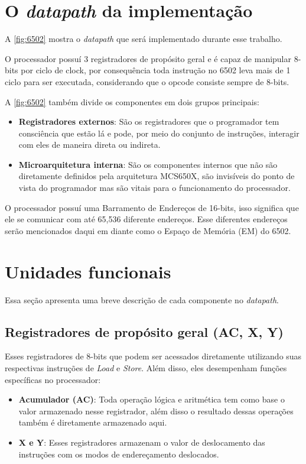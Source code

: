 \documentclass[
	12pt,				  %
	openright,		%
	a4paper,			%
	english,			%
	french,				%
	spanish,			%
	brazil,				%
]{abntex2}
\begin{document}
\section{O \emph{datapath} da implementação}
A \autoref{fig:6502} mostra o \emph{datapath} que será implementado durante esse
trabalho.

O processador possuí 3 registradores de propósito geral e é capaz de manipular
8-bits por ciclo de clock, por consequência toda instrução no 6502 leva mais de
1 ciclo para ser executada, considerando que o opcode consiste sempre de 8-bits.

A \autoref{fig:6502} também divide os componentes em dois grupos principais:
\begin{itemize}
	\item \textbf{Registradores externos}: São os registradores que o programador
	      tem consciência que estão lá e pode, por meio do conjunto de instruções,
	      interagir com eles de maneira direta ou indireta.
	\item \textbf{Microarquitetura interna}: São os componentes internos que não
	      são diretamente definidos pela arquitetura MCS650X, são invisíveis do
	      ponto de vista do programador mas são vitais para o funcionamento do
	      processador.
\end{itemize}

O processador possuí uma Barramento de Endereços de 16-bits, isso significa que
ele se comunicar com até 65,536 diferente endereços. Esse diferentes endereços
serão mencionados daqui em diante como o Espaço de Memória (EM) do 6502.

\section{Unidades funcionais}
Essa seção apresenta uma breve descrição de cada componente no \emph{datapath}.

\subsection{Registradores de propósito geral (AC, X, Y)}
Esses registradores de 8-bits que podem ser acessados diretamente utilizando
suas respectivas instruções de \emph{Load} e \emph{Store}. Além disso, eles
desempenham funções específicas no processador:
\begin{itemize}
	\item \textbf{Acumulador (AC)}: Toda operação lógica e aritmética tem como
	      base o valor armazenado nesse registrador, além disso o resultado dessas
	      operações também é diretamente armazenado aqui.
	\item \textbf{X e Y}: Esses registradores armazenam o valor de deslocamento
	      das instruções com os modos de endereçamento deslocados.
\end{itemize}
\end{document}
